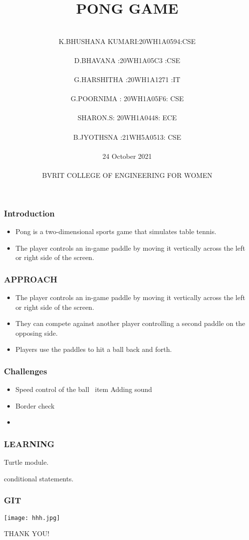 \documentclass[12pt]{beamer}
\title{ PONG GAME }
\date{}
\author[Bvrith]{
  \\K.BHUSHANA KUMARI:20WH1A0594:CSE\\
  \\D.BHAVANA :20WH1A05C3  :CSE\\
  \\G.HARSHITHA :20WH1A1271 :IT\\ 
  \\G.POORNIMA : 20WH1A05F6: CSE\\
  \\SHARON.S:  20WH1A0448: ECE\\
  \\B.JYOTHSNA :21WH5A0513: CSE \\\vspace{1cm}
  \\24 October 2021\\
  \vspace{2cm} 
 \\ BVRIT COLLEGE OF ENGINEERING FOR WOMEN\\ 
 }
\begin{document}
 
\begin{frame} 
  \titlepage 
\end{frame} 
\begin{frame}
\frametitle{Introduction} 
  \begin{itemize}
      \item Pong is a two-dimensional sports game that simulates table tennis.\item The player controls an in-game paddle by moving it vertically across the left or right side of the screen.
  \end{itemize}
\end{frame}

\begin{frame} 
\frametitle{APPROACH} 
\begin{itemize}
  \item The player controls an in-game paddle by moving it vertically across the left or right side of the screen. \item They can compete against another player controlling a second paddle on the opposing side.\item Players use the paddles to hit a ball back and forth.   
\end{itemize}
\end{frame} 
\begin{frame} 
\frametitle{Challenges}
\begin{itemize}
    
    \item Speed control of the ball \ item Adding sound \item Border check \item 
\end{itemize}
\end{frame}

\begin{frame}
\frametitle{LEARNING}
\begin{itemsize}
  \item Turtle module.\item conditional statements.
\end{itemsize}
\end{frame}

\begin{frame}
\frametitle{GIT}
\texttt{[image: hhh.jpg]}
\end{frame}

\begin{frame} 
\begin{center}
    THANK YOU!
\end{center} 
\end{frame}
\end{document}

